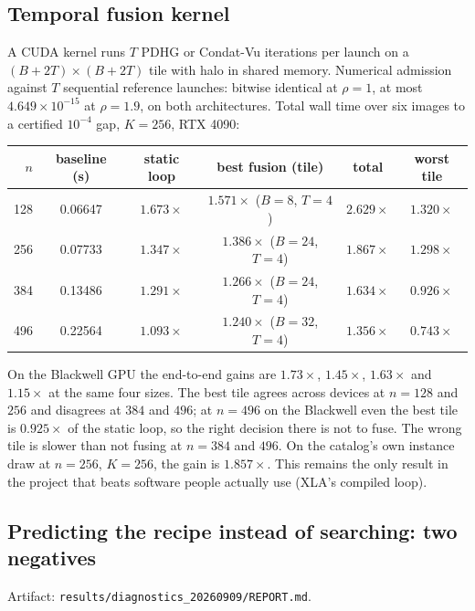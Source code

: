 \subsection{Temporal fusion kernel}
\label{app:log:fusion}

A CUDA kernel runs $T$ PDHG or Condat-Vu iterations per launch on a
$(B+2T)\times(B+2T)$ tile with halo in shared memory. Numerical admission
against $T$ sequential reference launches: bitwise identical at $\rho=1$, at
most $4.649\times10^{-15}$ at $\rho=1.9$, on both architectures. Total wall
time over six images to a certified $10^{-4}$ gap, $K=256$, RTX 4090:

\begin{center}
\small
\begin{tabular}{rccccc}
\toprule
$n$ & baseline (s) & static loop & best fusion (tile) & total & worst tile \\
\midrule
128 & 0.06647 & $1.673\times$ & $1.571\times$ ($B=8$, $T=4$) & $2.629\times$ & $1.320\times$ \\
256 & 0.07733 & $1.347\times$ & $1.386\times$ ($B=24$, $T=4$) & $1.867\times$ & $1.298\times$ \\
384 & 0.13486 & $1.291\times$ & $1.266\times$ ($B=24$, $T=4$) & $1.634\times$ & $0.926\times$ \\
496 & 0.22564 & $1.093\times$ & $1.240\times$ ($B=32$, $T=4$) & $1.356\times$ & $0.743\times$ \\
\bottomrule
\end{tabular}
\end{center}

On the Blackwell GPU the end-to-end gains are $1.73\times$, $1.45\times$,
$1.63\times$ and $1.15\times$ at the same four sizes. The best tile agrees
across devices at $n=128$ and $256$ and disagrees at $384$ and $496$; at
$n=496$ on the Blackwell even the best tile is $0.925\times$ of the static
loop, so the right decision there is not to fuse. The wrong tile is slower
than not fusing at $n=384$ and $496$. On the catalog's own instance draw at
$n=256$, $K=256$, the gain is $1.857\times$. This remains the only result in
the project that beats software people actually use (XLA's compiled loop).

\subsection{Predicting the recipe instead of searching: two negatives}
\label{app:log:diagnostics}

Artifact: \texttt{results/diagnostics\_20260909/REPORT.md}.

